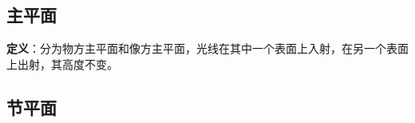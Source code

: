 
\begin{issues}
\issueDraft
\end{issues}


\subsection{主平面}

\textbf{定义}：分为物方主平面和像方主平面，光线在其中一个表面上入射，在另一个表面上出射，其高度不变。

\subsection{节平面}
